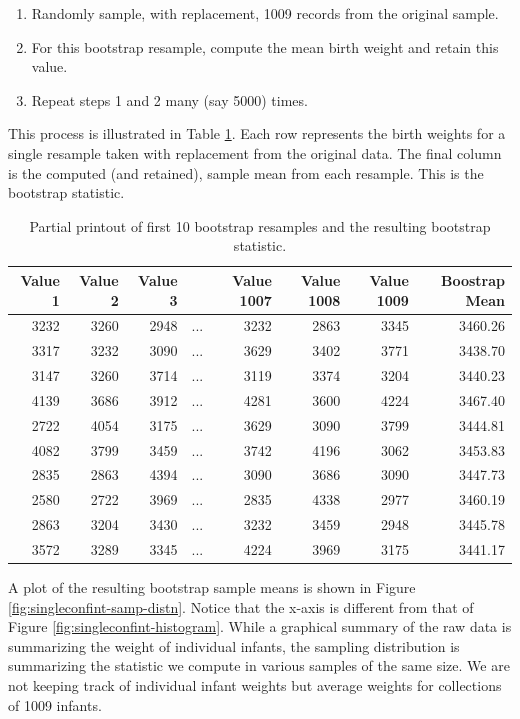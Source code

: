 \documentclass[]{book}
\providecommand{\tightlist}{%
  \setlength{\itemsep}{0pt}\setlength{\parskip}{0pt}}
\theoremstyle{plain}
\theoremstyle{mydefn}
\theoremstyle{myexmpl}
\theoremstyle{remark}
\begin{document}
\begin{enumerate}
\def\labelenumi{\arabic{enumi}.}
\tightlist
\item
  Randomly sample, with replacement, 1009 records from the original
  sample.
\item
  For this bootstrap resample, compute the mean birth weight and retain
  this value.
\item
  Repeat steps 1 and 2 many (say 5000) times.
\end{enumerate}

This process is illustrated in Table \ref{tab:singleconfint-bootstrap}.
Each row represents the birth weights for a single resample taken with
replacement from the original data. The final column is the computed
(and retained), sample mean from each resample. This is the bootstrap
statistic.

\begin{table}

\caption{\label{tab:singleconfint-bootstrap}Partial printout of first 10 bootstrap resamples and the resulting bootstrap statistic.}
\centering
\begin{tabular}[t]{r|r|r|l|r|r|r|r}
\hline
Value 1 & Value 2 & Value 3 &         & Value 1007 & Value 1008 & Value 1009 & Boostrap Mean\\
\hline
3232 & 3260 & 2948 & ... & 3232 & 2863 & 3345 & 3460.26\\
\hline
3317 & 3232 & 3090 & ... & 3629 & 3402 & 3771 & 3438.70\\
\hline
3147 & 3260 & 3714 & ... & 3119 & 3374 & 3204 & 3440.23\\
\hline
4139 & 3686 & 3912 & ... & 4281 & 3600 & 4224 & 3467.40\\
\hline
2722 & 4054 & 3175 & ... & 3629 & 3090 & 3799 & 3444.81\\
\hline
4082 & 3799 & 3459 & ... & 3742 & 4196 & 3062 & 3453.83\\
\hline
2835 & 2863 & 4394 & ... & 3090 & 3686 & 3090 & 3447.73\\
\hline
2580 & 2722 & 3969 & ... & 2835 & 4338 & 2977 & 3460.19\\
\hline
2863 & 3204 & 3430 & ... & 3232 & 3459 & 2948 & 3445.78\\
\hline
3572 & 3289 & 3345 & ... & 4224 & 3969 & 3175 & 3441.17\\
\hline
\end{tabular}
\end{table}

A plot of the resulting bootstrap sample means is shown in Figure
\ref{fig:singleconfint-samp-distn}. Notice that the x-axis is different
from that of Figure \ref{fig:singleconfint-histogram}. While a graphical
summary of the raw data is summarizing the weight of individual infants,
the sampling distribution is summarizing the statistic we compute in
various samples of the same size. We are not keeping track of individual
infant weights but average weights for collections of 1009 infants.
\end{document}
